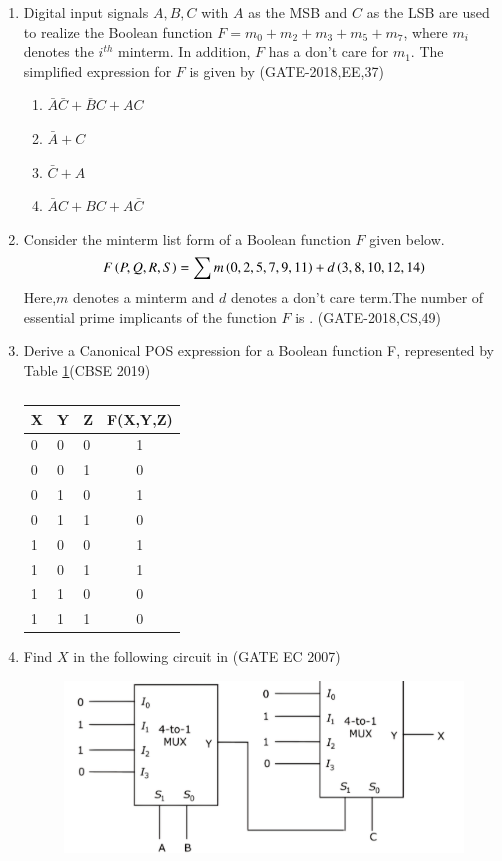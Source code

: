 \begin{enumerate}[label=\arabic*.,ref=\theenumi]
		
\item Digital input signals $A, B, C$ with $A$ as the MSB and $C$ as the LSB are used to realize the Boolean function $F=m_0+m_2+m_3+m_5+m_7$, where $m_i$ denotes the $i^{th}$ minterm. In addition, $F$ has a don't care for $m_1$. The simplified expression for $F$ is given by 
\hfill (GATE-2018,EE,37)
\begin{enumerate}
    \item $\bar{A} \bar{C}+\bar{B} C+A C$
    \item$\bar{A}+C$
    \item$\bar{C}+A$ 
    \item$\bar{A} C+BC+A\bar{C}$
\end{enumerate}
\item Consider the minterm list form of a Boolean function $F$ given below.
\begin{align*}
	F\left(P,Q,R,S\right)=\sum m\left(0,2,5,7,9,11\right)+d\left(3,8,10,12,14\right)
\end{align*}
Here,$m$ denotes a minterm and $d$ denotes a don't care term.The number of essential prime implicants of the function $F$ is \underline{\hspace{2cm}} . 	
	\hfill (GATE-2018,CS,49)
\item Derive a Canonical POS expression for a Boolean function F, represented by 
Table \ref{tab:2019/c/6/c}\hfill (CBSE 2019)
\label{prob:2019/c/6/c}
\begin{table}[H]
\centering
\begin{tabular}{|l|l|l|c|}
	\hline
	X&Y&Z&F(X,Y,Z)\\
	\hline
	0&0&0&1\\
	0&0&1&0\\
	0&1&0&1\\
	0&1&1&0\\
	1&0&0&1\\
	1&0&1&1\\
	1&1&0&0\\
	1&1&1&0\\
	\hline
\end{tabular}
\caption{}
\label{tab:2019/c/6/c}
\end{table}
%
\item 
Find $X$ in the following circuit in 
\hfill (GATE EC 2007)
\label{prob:2007-gate-ec-43}
\begin{figure}[H]
\centering
	\includegraphics[width=0.75\columnwidth]{figs/2007-gate-ec-43.png}

\end{figure}
\end{enumerate}
